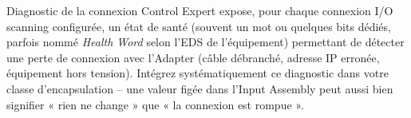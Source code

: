 \begin{UPSTIinfor}{Diagnostic de la connexion}
    Control Expert expose, pour chaque connexion I/O scanning configurée, un état de santé (souvent un mot ou quelques bits dédiés, parfois nommé \emph{Health Word} selon l'EDS de l'équipement) permettant de détecter une perte de connexion avec l'Adapter (câble débranché, adresse IP erronée, équipement hors tension). Intégrez systématiquement ce diagnostic dans votre classe d'encapsulation -- une valeur figée dans l'Input Assembly peut aussi bien signifier « rien ne change » que « la connexion est rompue ».
\end{UPSTIinfor}
